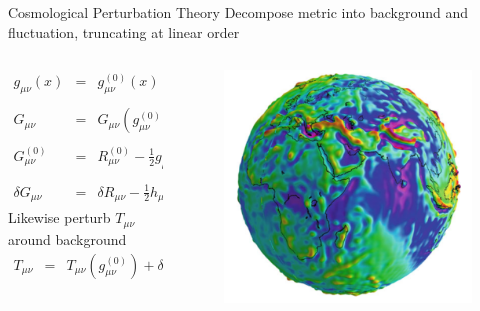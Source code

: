 \documentclass[8pt]{beamer}
\begin{document}
\begin{frame}{Cosmological Perturbation Theory}
	Decompose metric into background and fluctuation, truncating at linear order
	\begin{columns}
		\begin{column}{0.7\linewidth}
			\begin{eqnarray*}
				g_{\mu\nu}(x) &=& g_{\mu\nu}^{(0)}(x) + h_{\mu\nu}(x),\qquad g^{\mu\nu}_{(0)}h_{\mu\nu} \equiv h
				\\ \\
				G_{\mu\nu} &=& G_{\mu\nu}(g_{\mu\nu}^{(0)}) + \delta G_{\mu\nu}(h_{\mu\nu})
				\\ \\
				G_{\mu\nu}^{(0)} &=& R_{\mu\nu}^{(0)} -\frac{1}{2} g_{\mu\nu}^{(0)} R_\alpha^{(0)\alpha}
				\label{Einzero}
				\\ \\
				\delta G_{\mu\nu} &=& \delta R_{\mu\nu} - \frac{1}{2} h_{\mu\nu} R_\alpha^{(0)\alpha} -\frac{1}{2}g_{\mu\nu}\delta R^\alpha{}_\alpha.
			\end{eqnarray*}
			\hspace{.04\linewidth}Likewise perturb $T_{\mu\nu}$ around background
			\begin{eqnarray*}
				T_{\mu\nu} &=& T_{\mu\nu}(g_{\mu\nu}^{(0)}) + \delta T_{\mu\nu}(h_{\mu\nu})
			\end{eqnarray*}
		\end{column}
		\begin{column}{0.3\linewidth}
			\begin{figure}[t]
				\includegraphics[width=\linewidth]{sphere_perturb.png}

\end{figure}
\end{column}
\end{columns}
\end{frame}
\end{document}

